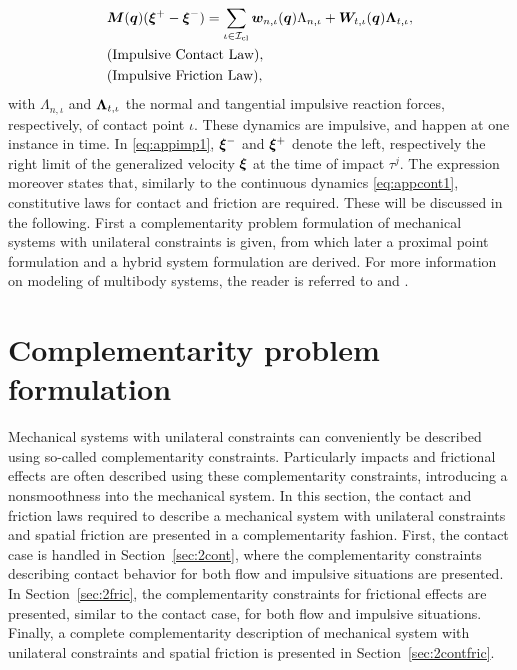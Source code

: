 \documentclass[../DC2017114Bouma.tex]{subfiles}
\begin{document}
\begin{align}
&{\boldsymbol{M}}({\boldsymbol{q}})(\boldsymbol{\xi}^+ - \boldsymbol{\xi}^-) = \sum_{\iota\in\mathcal{I}_{\text{cl}}} {\boldsymbol{w}}_{n,\iota}({\boldsymbol{q}})\Lambda_{n,\iota} + {\boldsymbol{W}}_{t,\iota}({\boldsymbol{q}})\boldsymbol{\Lambda}_{t,\iota}, \label{eq:appimp1}\\
&\text{(Impulsive Contact Law)},\nonumber\\
&\text{(Impulsive Friction Law)},\nonumber
\end{align}
with $\Lambda_{n,\iota}$ and $\boldsymbol{\Lambda}_{t,\iota}$ the normal and tangential impulsive reaction forces, respectively, of contact point $\iota$. These dynamics are impulsive, and happen at one instance in time. In \eqref{eq:appimp1}, $\boldsymbol{\xi}^-$ and $\boldsymbol{\xi}^+$ denote the left, respectively the right limit of the generalized velocity $\boldsymbol{\xi}$ at the time of impact $\tau^j$. The expression moreover states that, similarly to the continuous dynamics \eqref{eq:appcont1}, constitutive laws for contact and friction are required. These will be discussed in the following. First a complementarity problem formulation of mechanical systems with unilateral constraints is given, from which later a proximal point formulation and a hybrid system formulation are derived. For more information on modeling of multibody systems, the reader is referred to \cite{Leine2008} and \cite{Wouw2016}.

\section{Complementarity problem formulation}\label{sec:comp}
Mechanical systems with unilateral constraints can conveniently be described using so-called complementarity constraints. Particularly impacts and frictional effects are often described using these complementarity constraints, introducing a nonsmoothness into the mechanical system. In this section, the contact and friction laws required to describe a mechanical system with unilateral constraints and spatial friction are presented in a complementarity fashion. First, the contact case is handled in Section~\ref{sec:2cont}, where the complementarity constraints describing contact behavior for both flow and impulsive situations are presented. In Section~\ref{sec:2fric}, the complementarity constraints for frictional effects are presented, similar to the contact case, for both flow and impulsive situations. Finally, a complete complementarity description of mechanical system with unilateral constraints and spatial friction is presented in Section~\ref{sec:2contfric}.
\end{document}
